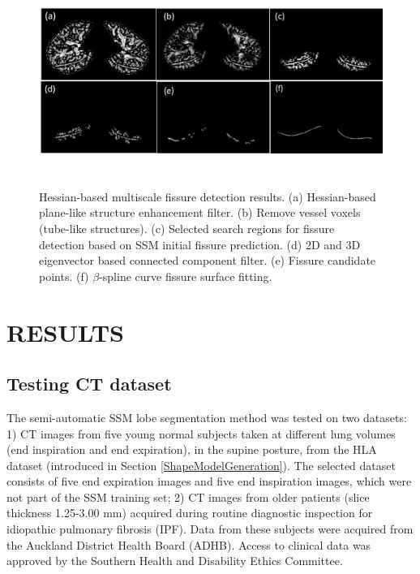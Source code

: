 \documentclass[]{spie}  %
\begin{document}
{\begin{figure}[htbp]
  \centering 
  \includegraphics[height=2.7in]{Image/WholeFissureDetection.jpg}
  \caption{Hessian-based multiscale fissure detection results. (a) Hessian-based plane-like structure enhancement filter. (b) Remove vessel voxels (tube-like structures). (c) Selected search regions for fissure detection based on SSM initial fissure prediction. (d) 2D and 3D eigenvector based connected component filter. (e) Fissure candidate points. (f) $\beta$-spline curve fissure surface fitting.}
  \label{fig:FissureDetection}
\end{figure}

\section{RESULTS}
\label{SegmentationExperiment}
 
\subsection{Testing CT dataset}

The semi-automatic SSM lobe segmentation method was tested on two datasets: 1) CT images from five young normal subjects taken at different lung volumes (end inspiration and end expiration), in the supine posture, from the HLA dataset (introduced in Section \ref{ShapeModelGeneration}). The selected dataset consists of five end expiration images and five end inspiration images, which were not part of the SSM training set; 2) CT images from older patients (slice thickness 1.25-3.00 mm) acquired during routine diagnostic inspection for idiopathic pulmonary fibrosis (IPF). Data from these subjects were acquired from the Auckland District Health Board (ADHB). Access to clinical data was approved by the Southern Health and Disability Ethics Committee. 

}
\end{document}
